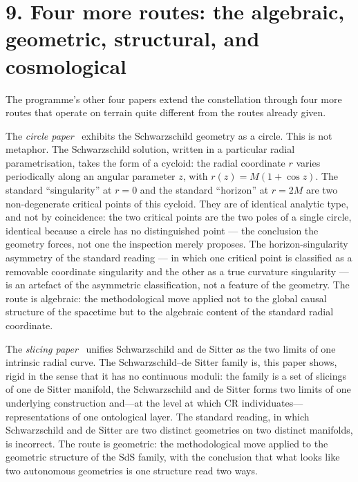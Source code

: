 \documentclass[11pt,a4paper]{article}
\begin{document}
\section*{9. Four more routes: the algebraic, geometric, structural, and cosmological}

The programme's other four papers extend the constellation through four more routes that operate on terrain quite different from the routes already given.

The \textit{circle paper}~\cite{JanzenCircle} exhibits the Schwarzschild geometry as a circle. This is not metaphor. The Schwarzschild solution, written in a particular radial parametrisation, takes the form of a cycloid: the radial coordinate $r$ varies periodically along an angular parameter $z$, with $r(z) = M(1 + \cos z)$. The standard ``singularity'' at $r = 0$ and the standard ``horizon'' at $r = 2M$ are two non-degenerate critical points of this cycloid. They are of identical analytic type, and not by coincidence: the two critical points are the two poles of a single circle, identical because a circle has no distinguished point --- the conclusion the geometry forces, not one the inspection merely proposes. The horizon-singularity asymmetry of the standard reading --- in which one critical point is classified as a removable coordinate singularity and the other as a true curvature singularity --- is an artefact of the asymmetric classification, not a feature of the geometry. The route is algebraic: the methodological move applied not to the global causal structure of the spacetime but to the algebraic content of the standard radial coordinate.

The \textit{slicing paper}~\cite{JanzenSlicing} unifies Schwarzschild and de Sitter as the two limits of one intrinsic radial curve. The Schwarzschild--de Sitter family is, this paper shows, rigid in the sense that it has no continuous moduli: the family is a set of slicings of one de Sitter manifold, the Schwarzschild and de Sitter forms two limits of one underlying construction and---at the level at which CR individuates---representations of one ontological layer. The standard reading, in which Schwarzschild and de Sitter are two distinct geometries on two distinct manifolds, is incorrect. The route is geometric: the methodological move applied to the geometric structure of the SdS family, with the conclusion that what looks like two autonomous geometries is one structure read two ways.
\end{document}
